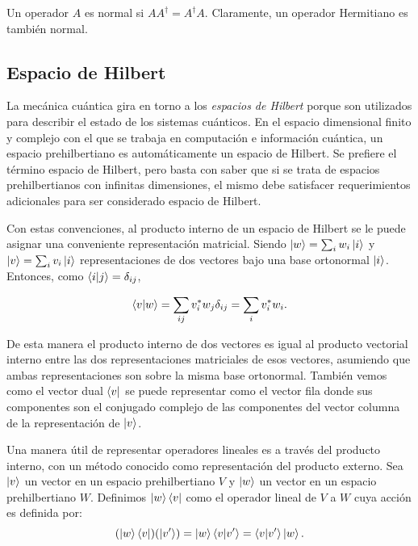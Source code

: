 \begin{definicion}
Un operador $A$ es normal si $AA^\dagger = A^\dagger A$. Claramente, un operador Hermitiano es también normal. 
\end{definicion}

\subsection{Espacio de Hilbert}\label{sub:hilbert}

La mecánica cuántica gira en torno a los \emph{espacios de Hilbert} porque son utilizados para describir el estado de los sistemas cuánticos. En el espacio dimensional finito y complejo con el que se trabaja en computación e información cuántica, un espacio prehilbertiano es automáticamente un espacio de Hilbert. Se prefiere el término espacio de Hilbert, pero basta con saber que si se trata de espacios prehilbertianos con infinitas dimensiones, el mismo debe satisfacer requerimientos adicionales para ser considerado espacio de Hilbert.



Con estas convenciones, al producto interno de un espacio de Hilbert se le puede asignar una conveniente representación matricial. Siendo $\ket{w} = \sum_i w_i\ket{i}$ y $\ket{v} = \sum_i v_i\ket{i}$ representaciones de dos vectores bajo una base ortonormal $\ket{i}$. Entonces, como $\braket{i|j} = \delta_{ij}$,

\begin{equation}
    \braket{v|w} = \sum_{ij} v_i^* w_j \delta_{ij}  = \sum_i v_i^* w_i.
\end{equation}

De esta manera el producto interno de dos vectores es igual al producto vectorial interno entre las dos representaciones matriciales de esos vectores, asumiendo que ambas representaciones son sobre la misma base ortonormal. También vemos como el vector dual $\bra{v}$ se puede representar como el vector fila donde sus componentes son el conjugado complejo de las componentes del vector columna de la representación de $\ket{v}$.

Una manera útil de representar operadores lineales es a través del producto interno, con un método conocido como representación del producto externo. Sea $\ket{v}$ un vector en un espacio prehilbertiano $V$ y $\ket{w}$ un vector en un espacio prehilbertiano $W$. Definimos $\ket{w}\bra{v}$ como el operador lineal de $V$ a $W$ cuya acción es definida por:
\begin{equation}
    (\ket{w}\bra{v}) (\ket{v'}) = \ket{w} \braket{v|v'} = \braket{v|v'} \ket{w}.
\end{equation}

